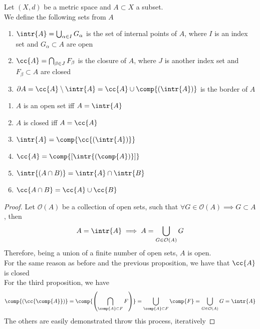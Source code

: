 \documentclass[../mmf.tex]{subfiles}
\begin{document}
\begin{dfn}
	Let $(X,d)$ be a metric space and $A\subset X$ a subset.\\
	We define the following sets from $A$
	\begin{enumerate}
	\item $\intr{A}=\bigcup_{\alpha\in I}G_\alpha$ is the set of internal points of $A$, where $I$ is an index set and $G_{\alpha}\subset A$ are open
	\item $\cc{A}=\bigcap_{\beta\in J}F_\beta$ is the closure of $A$, where $J$ is another index set and $F_\beta\subset A$ are closed
	\item $\partial{A}=\cc{A}\setminus\intr{A}=\cc{A}\cup\comp{\left(\intr{A}\right)}$ is the border of $A$
	\end{enumerate}
\end{dfn}
\begin{prop}
	\begin{enumerate}
	\item $A$ is an open set iff $A=\intr{A}$
	\item $A$ is closed iff $A=\cc{A}$
	\item $\intr{A}=\comp{\cc{\left( \intr{A} \right)}}$
	\item $\cc{A}=\comp{\left[ \intr{\left( \comp{A} \right)} \right]}$
	\item $\intr{\left( A\cap B \right)}=\intr{A}\cap\intr{B}$
	\item $\cc{A\cap B}=\cc{A}\cup\cc{B}$
	\end{enumerate}
\end{prop}
\begin{proof}
	Let $\mathcal{O}(A)$ be a collection of open sets, such that $\forall{G}\in\mathcal{O}(A)\implies{} G\subset A$, then
	\begin{equation*}
		A=\intr{A}\implies{} A=\bigcup_{G\in\mathcal{O}(A)}G
	\end{equation*}
	Therefore, being a union of a finite number of open sets, $A$ is open.\\
	For the same reason as before and the previous proposition, we have that $\cc{A}$ is closed\\
	For the third proposition, we have
	\begin{equation*}
		\comp{\left( \cc{\comp{A}} \right)}=\comp{\left( \bigcap_{\comp{A}\subset F}F \right)}=\bigcup_{\comp{A}\subset F}\comp{F}=\bigcup_{G\in\mathcal{O}(A)}G=\intr{A}
	\end{equation*}
	The others are easily demonstrated throw this process, iteratively
\end{proof}
\end{document}

